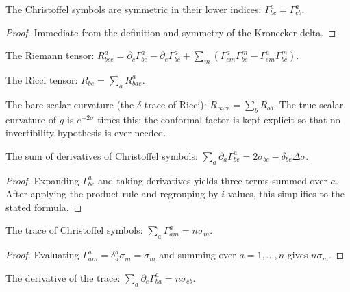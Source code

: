 \begin{theorem}
The Christoffel symbols are symmetric in their lower indices: $\Gamma^a_{bc} = \Gamma^a_{cb}$. 
\end{theorem}

\begin{proof}
Immediate from the definition and symmetry of the Kronecker delta.
\end{proof}

\begin{definition}
The Riemann tensor: $R^a_{bce} = \partial_c \Gamma^a_{be} - \partial_e \Gamma^a_{bc} + \sum_m (\Gamma^a_{cm}\Gamma^m_{be} - \Gamma^a_{em}\Gamma^m_{bc})$. 
\end{definition}

\begin{definition}
The Ricci tensor: $R_{be} = \sum_a R^a_{bae}$. 
\end{definition}

\begin{definition}
The bare scalar curvature (the $\delta$-trace of Ricci): $R_{\text{bare}} = \sum_b R_{bb}$. The true scalar curvature of $g$ is $e^{-2\sigma}$ times this; the conformal factor is kept explicit so that no invertibility hypothesis is ever needed. 
\end{definition}

\begin{theorem}
The sum of derivatives of Christoffel symbols: $\sum_a \partial_a \Gamma^a_{be} = 2\sigma_{be} - \delta_{be}\Delta\sigma$. 
\end{theorem}

\begin{proof}
Expanding $\Gamma^a_{be}$ and taking derivatives yields three terms summed over $a$. After applying the product rule and regrouping by $i$-values, this simplifies to the stated formula.
\end{proof}

\begin{theorem}
The trace of Christoffel symbols: $\sum_a \Gamma^a_{am} = n\sigma_m$. 
\end{theorem}

\begin{proof}
Evaluating $\Gamma^a_{am} = \delta^a_a \sigma_m = \sigma_m$ and summing over $a = 1, \ldots, n$ gives $n\sigma_m$.
\end{proof}

\begin{theorem}
The derivative of the trace: $\sum_a \partial_e \Gamma^a_{ba} = n\sigma_{eb}$. 
\end{theorem}

